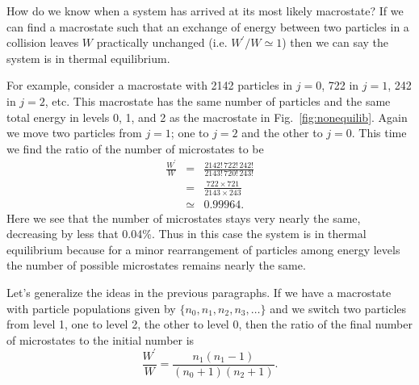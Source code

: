 How do we know when a system has arrived at its most likely
macrostate?  If we can find a macrostate such that an exchange of
energy between two particles in a collision leaves $W$ practically
unchanged (i.e. $W^\prime/W \simeq 1$) then we can say the system is
in thermal equilibrium.

For example, consider a macrostate with 2142 particles in $j=0$,
722 in $j=1$, 242 in $j=2$, etc.  This macrostate has the same 
number of particles and the same total energy in levels 0, 1, and 2 as
the macrostate in Fig.~\ref{fig:nonequilib}.  Again we move two 
particles from $j=1$; one to $j=2$ and the other to $j=0$.  This 
time we find the ratio of the number of microstates to be 
\begin{eqnarray}
\frac{W^\prime}{W} &=& \frac{2142!\, 722!\, 242!}{2143!\, 720!\, 243!}
                               \nonumber \\
                   &=& \frac{722\times 721}{2143\times 243} \nonumber \\
                   &\simeq& 0.99964.
\end{eqnarray}
Here we see that the number of microstates stays very nearly the same,
decreasing by less that 0.04\%.  Thus in this case the system is in
thermal equilibrium because for a minor rearrangement of particles
among energy levels the number of possible microstates remains nearly
the same.

Let's generalize the ideas in the previous paragraphs.  If we 
have a macrostate with particle populations given by $\{ n_0, n_1, 
n_2, n_3, \dots\}$ and we switch two particles from level 1, one to level 2,
the other to level 0, then the ratio of the final number of 
microstates to the initial number is 
\begin{equation}
\frac{W^\prime}{W} = \frac{n_1(n_1-1)}{(n_0+1)(n_2+1)}. 
\end{equation}

